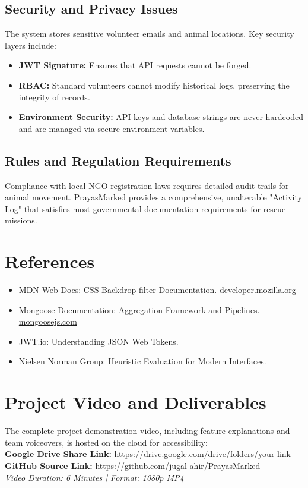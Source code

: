 \documentclass[12pt,a4paper]{report}
\begin{document}
\section{Security and Privacy Issues}
The system stores sensitive volunteer emails and animal locations. Key security layers include:
\begin{itemize}
    \item \textbf{JWT Signature:} Ensures that API requests cannot be forged.
    \item \textbf{RBAC:} Standard volunteers cannot modify historical logs, preserving the integrity of records.
    \item \textbf{Environment Security:} API keys and database strings are never hardcoded and are managed via secure environment variables.
\end{itemize}

\section{Rules and Regulation Requirements}
Compliance with local NGO registration laws requires detailed audit trails for animal movement. PrayasMarked provides a comprehensive, unalterable "Activity Log" that satisfies most governmental documentation requirements for rescue missions.

\chapter{References}
\begin{itemize}
    \item [1] MDN Web Docs: CSS Backdrop-filter Documentation. \href{https://developer.mozilla.org}{developer.mozilla.org}
    \item [2] Mongoose Documentation: Aggregation Framework and Pipelines. \href{https://mongoosejs.com}{mongoosejs.com}
    \item [3] JWT.io: Understanding JSON Web Tokens.
    \item [4] Nielsen Norman Group: Heuristic Evaluation for Modern Interfaces.
\end{itemize}

\chapter{Project Video and Deliverables}
The complete project demonstration video, including feature explanations and team voiceovers, is hosted on the cloud for accessibility: \\
\vspace{0.5cm}
\textbf{Google Drive Share Link:} \href{https://drive.google.com/drive/folders/your-video-link-here}{https://drive.google.com/drive/folders/your-link} \\
\vspace{0.2cm}
\textbf{GitHub Source Link:} \href{https://github.com/jugal-ahir/PrayasMarked}{https://github.com/jugal-ahir/PrayasMarked} \\
\textit{Video Duration: 6 Minutes | Format: 1080p MP4}
\end{document}
